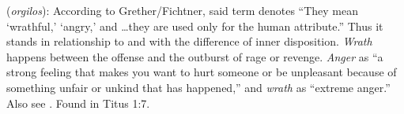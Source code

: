 \item[Wrath,]

(\textit{orgilos}):
According to Grether/Fichtner, said term denotes ``They mean `wrathful,' `angry,' and \ldots they are used only for the human attribute.''
Thus it stands in relationship to  and  with the difference of inner disposition. \emph{Wrath} happens between the offense and the outburst of rage or revenge. \emph{Anger} as ``a strong feeling that makes you want to hurt someone or be unpleasant because of something unfair or unkind that has happened,'' and \emph{wrath} as ``extreme anger.'' Also see .
Found in Titus 1:7.
